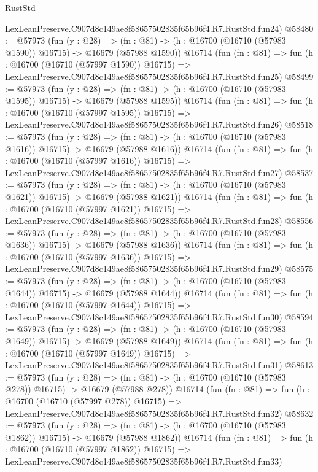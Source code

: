 \begin{lexlean}{RustStd}
\begin{coremodule}
    LexLeanPreserve.C907d8c149ae8f58657502835f65b96f4.R7.RustStd.fun24)
@58480 := @57973
    (fun (y : @28) =>
    (fn : @81) -> (h : @16700 (@16710 (@57983 @1590)) @16715) -> @16679 (@57988 @1590))
    @16714
    (fun (fn : @81) =>
    fun (h : @16700 (@16710 (@57997 @1590)) @16715) =>
    LexLeanPreserve.C907d8c149ae8f58657502835f65b96f4.R7.RustStd.fun25)
@58499 := @57973
    (fun (y : @28) =>
    (fn : @81) -> (h : @16700 (@16710 (@57983 @1595)) @16715) -> @16679 (@57988 @1595))
    @16714
    (fun (fn : @81) =>
    fun (h : @16700 (@16710 (@57997 @1595)) @16715) =>
    LexLeanPreserve.C907d8c149ae8f58657502835f65b96f4.R7.RustStd.fun26)
@58518 := @57973
    (fun (y : @28) =>
    (fn : @81) -> (h : @16700 (@16710 (@57983 @1616)) @16715) -> @16679 (@57988 @1616))
    @16714
    (fun (fn : @81) =>
    fun (h : @16700 (@16710 (@57997 @1616)) @16715) =>
    LexLeanPreserve.C907d8c149ae8f58657502835f65b96f4.R7.RustStd.fun27)
@58537 := @57973
    (fun (y : @28) =>
    (fn : @81) -> (h : @16700 (@16710 (@57983 @1621)) @16715) -> @16679 (@57988 @1621))
    @16714
    (fun (fn : @81) =>
    fun (h : @16700 (@16710 (@57997 @1621)) @16715) =>
    LexLeanPreserve.C907d8c149ae8f58657502835f65b96f4.R7.RustStd.fun28)
@58556 := @57973
    (fun (y : @28) =>
    (fn : @81) -> (h : @16700 (@16710 (@57983 @1636)) @16715) -> @16679 (@57988 @1636))
    @16714
    (fun (fn : @81) =>
    fun (h : @16700 (@16710 (@57997 @1636)) @16715) =>
    LexLeanPreserve.C907d8c149ae8f58657502835f65b96f4.R7.RustStd.fun29)
@58575 := @57973
    (fun (y : @28) =>
    (fn : @81) -> (h : @16700 (@16710 (@57983 @1644)) @16715) -> @16679 (@57988 @1644))
    @16714
    (fun (fn : @81) =>
    fun (h : @16700 (@16710 (@57997 @1644)) @16715) =>
    LexLeanPreserve.C907d8c149ae8f58657502835f65b96f4.R7.RustStd.fun30)
@58594 := @57973
    (fun (y : @28) =>
    (fn : @81) -> (h : @16700 (@16710 (@57983 @1649)) @16715) -> @16679 (@57988 @1649))
    @16714
    (fun (fn : @81) =>
    fun (h : @16700 (@16710 (@57997 @1649)) @16715) =>
    LexLeanPreserve.C907d8c149ae8f58657502835f65b96f4.R7.RustStd.fun31)
@58613 := @57973
    (fun (y : @28) =>
    (fn : @81) -> (h : @16700 (@16710 (@57983 @278)) @16715) -> @16679 (@57988 @278))
    @16714
    (fun (fn : @81) =>
    fun (h : @16700 (@16710 (@57997 @278)) @16715) =>
    LexLeanPreserve.C907d8c149ae8f58657502835f65b96f4.R7.RustStd.fun32)
@58632 := @57973
    (fun (y : @28) =>
    (fn : @81) -> (h : @16700 (@16710 (@57983 @1862)) @16715) -> @16679 (@57988 @1862))
    @16714
    (fun (fn : @81) =>
    fun (h : @16700 (@16710 (@57997 @1862)) @16715) =>
    LexLeanPreserve.C907d8c149ae8f58657502835f65b96f4.R7.RustStd.fun33)

\end{coremodule}
\end{lexlean}
